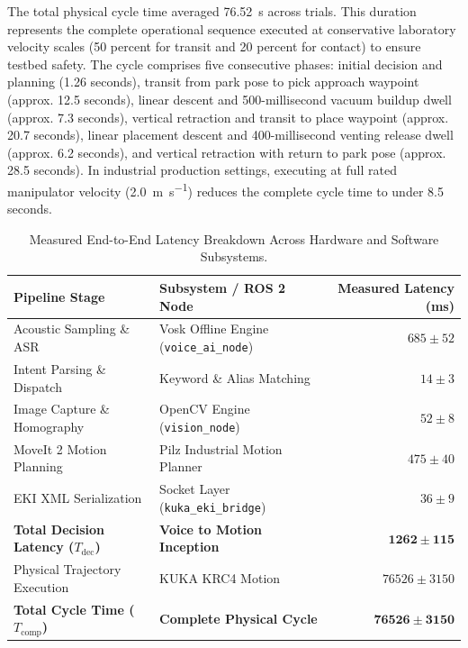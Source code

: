 \documentclass{svproc}
\begin{document}
The total physical cycle time averaged \SI{76.52}{\second} across trials. This duration represents the complete operational sequence executed at conservative laboratory velocity scales (50 percent for transit and 20 percent for contact) to ensure testbed safety. The cycle comprises five consecutive phases: initial decision and planning (1.26 seconds), transit from park pose to pick approach waypoint (approx. 12.5 seconds), linear descent and 500-millisecond vacuum buildup dwell (approx. 7.3 seconds), vertical retraction and transit to place waypoint (approx. 20.7 seconds), linear placement descent and 400-millisecond venting release dwell (approx. 6.2 seconds), and vertical retraction with return to park pose (approx. 28.5 seconds). In industrial production settings, executing at full rated manipulator velocity (\SI{2.0}{\meter\per\second}) reduces the complete cycle time to under 8.5 seconds.

\begin{table}[tb]
\caption{Measured End-to-End Latency Breakdown Across Hardware and Software Subsystems.}
\label{tab:latency_breakdown}
\centering
\begin{tabular}{llr}
\hline
\textbf{Pipeline Stage} & \textbf{Subsystem / ROS 2 Node} & \textbf{Measured Latency (ms)} \\
\hline
Acoustic Sampling \& ASR & Vosk Offline Engine (\texttt{voice\_ai\_node}) \cite{vosk2020} & $685 \pm 52$ \\
Intent Parsing \& Dispatch & Keyword \& Alias Matching & $14 \pm 3$ \\
Image Capture \& Homography & OpenCV Engine (\texttt{vision\_node}) & $52 \pm 8$ \\
MoveIt 2 Motion Planning & Pilz Industrial Motion Planner \cite{pilz_motion2021} & $475 \pm 40$ \\
EKI XML Serialization & Socket Layer (\texttt{kuka\_eki\_bridge}) \cite{kuka_eki_eval2022} & $36 \pm 9$ \\
\hline
\textbf{Total Decision Latency ($T_{\text{dec}}$)} & \textbf{Voice to Motion Inception} & $\mathbf{1262 \pm 115}$ \\
Physical Trajectory Execution & KUKA KRC4 Motion & $76526 \pm 3150$ \\
\hline
\textbf{Total Cycle Time ($T_{\text{comp}}$)} & \textbf{Complete Physical Cycle} & $\mathbf{76526 \pm 3150}$ \\
\hline
\end{tabular}
\end{table}
\end{document}
